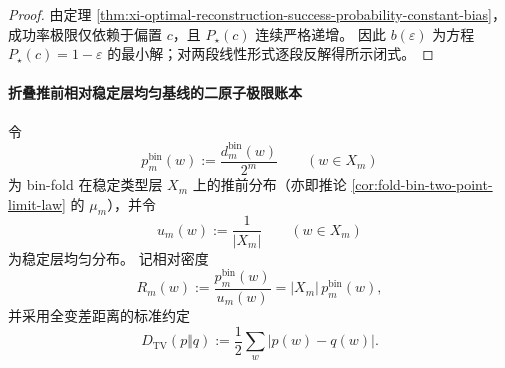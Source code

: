 \begin{proof}
由定理 \ref{thm:xi-optimal-reconstruction-success-probability-constant-bias}，成功率极限仅依赖于偏置 \(c\)，且 \(P_\star(c)\) 连续严格递增。
因此 \(b(\varepsilon)\) 为方程 \(P_\star(c)=1-\varepsilon\) 的最小解；对两段线性形式逐段反解得所示闭式。
\end{proof}


\paragraph{折叠推前相对稳定层均匀基线的二原子极限账本}
令
\[
p^{\mathrm{bin}}_m(w):=\frac{d^{\mathrm{bin}}_m(w)}{2^m}\qquad(w\in X_m)
\]
为 bin-fold 在稳定类型层 \(X_m\) 上的推前分布（亦即推论 \ref{cor:fold-bin-two-point-limit-law} 的 \(\mu_m\)），并令
\[
u_m(w):=\frac{1}{|X_m|}
\qquad(w\in X_m)
\]
为稳定层均匀分布。
记相对密度
\[
R_m(w):=\frac{p^{\mathrm{bin}}_m(w)}{u_m(w)}=|X_m|\,p^{\mathrm{bin}}_m(w),
\]
并采用全变差距离的标准约定
\[
D_{\mathrm{TV}}(p\Vert q):=\frac12\sum_{w}\bigl|p(w)-q(w)\bigr|.
\]

